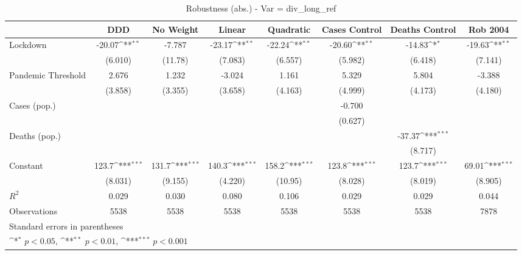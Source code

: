 \documentclass{article}
\begin{document}
{
\def\sym#1{\ifmmode^{#1}\else\(^{#1}\)\fi}
\begin{longtable}{l*{7}{c}}
\caption{Robustness (abs.) - Var = div\_long\_ref}\\
\hline\hline\endfirsthead\hline\endhead\hline\endfoot\endlastfoot
                &\multicolumn{1}{c}{DDD}&\multicolumn{1}{c}{No Weight}&\multicolumn{1}{c}{Linear}&\multicolumn{1}{c}{Quadratic}&\multicolumn{1}{c}{Cases Control}&\multicolumn{1}{c}{Deaths Control}&\multicolumn{1}{c}{Rob 2004}\\
\hline
Lockdown        &   -20.07\sym{**} &   -7.787         &   -23.17\sym{**} &   -22.24\sym{**} &   -20.60\sym{**} &   -14.83\sym{*}  &   -19.63\sym{**} \\
                &  (6.010)         &  (11.78)         &  (7.083)         &  (6.557)         &  (5.982)         &  (6.418)         &  (7.141)         \\
Pandemic Threshold&    2.676         &    1.232         &   -3.024         &    1.161         &    5.329         &    5.804         &   -3.388         \\
                &  (3.858)         &  (3.355)         &  (3.658)         &  (4.163)         &  (4.999)         &  (4.173)         &  (4.180)         \\
Cases (pop.)    &                  &                  &                  &                  &   -0.700         &                  &                  \\
                &                  &                  &                  &                  &  (0.627)         &                  &                  \\
Deaths (pop.)   &                  &                  &                  &                  &                  &   -37.37\sym{***}&                  \\
                &                  &                  &                  &                  &                  &  (8.717)         &                  \\
Constant        &    123.7\sym{***}&    131.7\sym{***}&    140.3\sym{***}&    158.2\sym{***}&    123.8\sym{***}&    123.7\sym{***}&    69.01\sym{***}\\
                &  (8.031)         &  (9.155)         &  (4.220)         &  (10.95)         &  (8.028)         &  (8.019)         &  (8.905)         \\
\hline
\(R^{2}\)       &    0.029         &    0.030         &    0.080         &    0.106         &    0.029         &    0.029         &    0.044         \\
Observations    &     5538         &     5538         &     5538         &     5538         &     5538         &     5538         &     7878         \\
\hline\hline
\multicolumn{8}{l}{\footnotesize Standard errors in parentheses}\\
\multicolumn{8}{l}{\footnotesize \sym{*} \(p<0.05\), \sym{**} \(p<0.01\), \sym{***} \(p<0.001\)}\\
\end{longtable}
}
\end{document}
